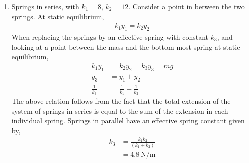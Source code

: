 \begin{enumerate}
    \item Springs in series, with $ k_{1} = 8 $, $ k_{2} = 12$. Consider a point in between the two
          springs. At static equilibrium,
          \begin{align}
              k_{1}y_{1} = k_{2}y_{2}
          \end{align}
          When replacing the springs by an effective spring with constant $ k_{3} $, and looking
          at a point between the mass and the bottom-most spring at static equilibrium,
          \begin{align}
              k_{1}y_{1}      & = k_{2}y_{2} = k_{3}y_{3} = mg      \\
              y_{3}           & = y_{1} + y_{2}                     \\
              \frac{1}{k_{3}} & = \frac{1}{k_{1}} + \frac{1}{k_{2}}
          \end{align}
          The above relation follows from the fact that the total extension of the system of
          springs in series is equal to the sum of the extension in each individual spring.
          Springs in parallel have an effective spring constant given by,
          \begin{align}
              k_{3} & = \frac{k_{1}k_{2}}{(k_{1} + k_{2})} \\
                    & = \SI{4.8}{\N\per\m}
          \end{align}


\end{enumerate}
